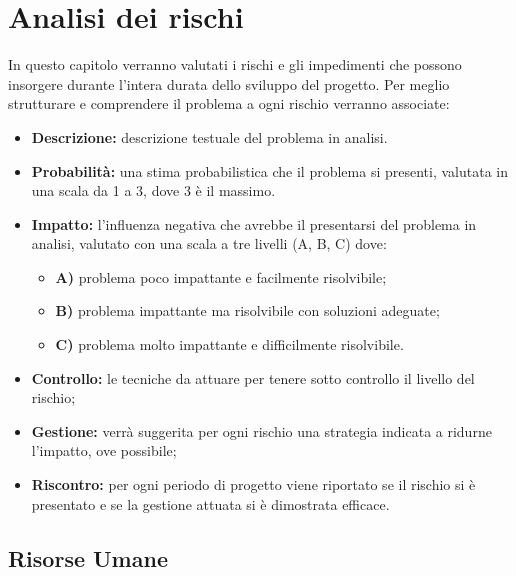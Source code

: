 \documentclass[a4paper,11pt]{article}
\begin{document}
	\section{Analisi dei rischi} \label{risk:rischi}
	In questo capitolo verranno valutati i rischi e gli impedimenti che possono insorgere durante l'intera durata dello sviluppo del progetto. Per meglio strutturare e comprendere il problema a ogni rischio verranno associate:
	\begin{itemize}
	\item \textbf{Descrizione:} descrizione testuale del problema in analisi.
	\item \textbf{Probabilità:} una stima probabilistica che il problema si presenti, valutata in una scala da 1 a 3, dove 3 è il massimo.
	\item \textbf{Impatto:} l'influenza negativa che avrebbe il presentarsi del problema in analisi, valutato con una scala a tre livelli (A, B, C) dove:
		\begin{itemize}
			\item \textbf{A)} problema poco impattante e facilmente risolvibile;
			\item \textbf{B)} problema impattante ma risolvibile con soluzioni adeguate;
			\item \textbf{C)} problema molto impattante e difficilmente risolvibile.
		\end{itemize}
	\item \textbf{Controllo:} le tecniche da attuare per tenere sotto controllo il livello del rischio;
	\item \textbf{Gestione:} verrà suggerita per ogni rischio una strategia indicata a ridurne l'impatto, ove possibile;
	\item \textbf{Riscontro:} per ogni periodo di progetto viene riportato se il rischio si è presentato e se la gestione attuata si è dimostrata efficace. 
	\end{itemize}
	
	\subsection{Risorse Umane} \label{risk:risorse}
\end{document}
